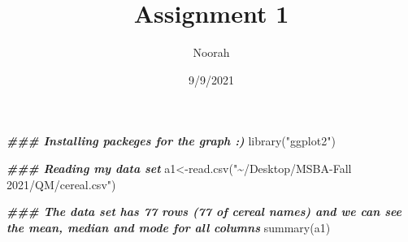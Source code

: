 \documentclass[
]{article}
\title{Assignment 1}
\author{Noorah}
\date{9/9/2021}
\newenvironment{Shaded}{\begin{snugshade}}{\end{snugshade}}
\newcommand{\DocumentationTok}[1]{\textcolor[rgb]{0.56,0.35,0.01}{\textbf{\textit{#1}}}}
\newcommand{\FunctionTok}[1]{\textcolor[rgb]{0.00,0.00,0.00}{#1}}
\newcommand{\NormalTok}[1]{#1}
\newcommand{\OtherTok}[1]{\textcolor[rgb]{0.56,0.35,0.01}{#1}}
\newcommand{\StringTok}[1]{\textcolor[rgb]{0.31,0.60,0.02}{#1}}
\begin{document}
\maketitle

\begin{Shaded}
\begin{Highlighting}[]
\DocumentationTok{\#\#\# Installing packeges for the graph :)}
\FunctionTok{library}\NormalTok{(}\StringTok{"ggplot2"}\NormalTok{)}
\end{Highlighting}
\end{Shaded}

\begin{Shaded}
\begin{Highlighting}[]
\DocumentationTok{\#\#\# Reading my data set}
\NormalTok{a1}\OtherTok{\textless{}{-}}\FunctionTok{read.csv}\NormalTok{(}\StringTok{"\textasciitilde{}/Desktop/MSBA{-}Fall 2021/QM/cereal.csv"}\NormalTok{)}
\end{Highlighting}
\end{Shaded}

\begin{Shaded}
\begin{Highlighting}[]
\DocumentationTok{\#\#\# The data set has 77 rows (77 of cereal names) and we can see the mean, median and mode for all columns }
\FunctionTok{summary}\NormalTok{(a1)}
\end{Highlighting}
\end{Shaded}
\end{document}
